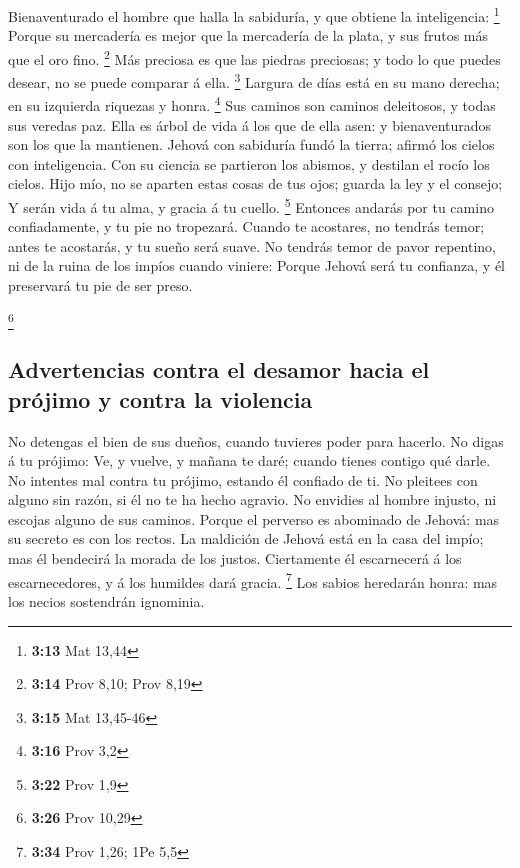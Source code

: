  Bienaventurado el hombre que halla la sabiduría, y que
obtiene la inteligencia: \footnote{\textbf{3:13} Mat 13,44}
 Porque su mercadería es mejor que la mercadería de la
plata, y sus frutos más que el oro fino. \footnote{\textbf{3:14} Prov
  8,10; Prov 8,19}  Más preciosa es que las piedras
preciosas; y todo lo que puedes desear, no se puede comparar á ella.
\footnote{\textbf{3:15} Mat 13,45-46}  Largura de días
está en su mano derecha; en su izquierda riquezas y honra. \footnote{\textbf{3:16}
  Prov 3,2}  Sus caminos son caminos deleitosos, y todas
sus veredas paz.  Ella es árbol de vida á los que de ella
asen: y bienaventurados son los que la mantienen.  Jehová
con sabiduría fundó la tierra; afirmó los cielos con inteligencia.
 Con su ciencia se partieron los abismos, y destilan el
rocío los cielos.  Hijo mío, no se aparten estas cosas de
tus ojos; guarda la ley y el consejo;  Y serán vida á tu
alma, y gracia á tu cuello. \footnote{\textbf{3:22} Prov 1,9}
 Entonces andarás por tu camino confiadamente, y tu pie
no tropezará.  Cuando te acostares, no tendrás temor;
antes te acostarás, y tu sueño será suave.  No tendrás
temor de pavor repentino, ni de la ruina de los impíos cuando viniere:
 Porque Jehová será tu confianza, y él preservará tu pie
de ser preso.

\footnote{\textbf{3:26} Prov 10,29}

\hypertarget{advertencias-contra-el-desamor-hacia-el-pruxf3jimo-y-contra-la-violencia}{%
\subsection{Advertencias contra el desamor hacia el prójimo y contra la
violencia}\label{advertencias-contra-el-desamor-hacia-el-pruxf3jimo-y-contra-la-violencia}}

 No detengas el bien de sus dueños, cuando tuvieres poder
para hacerlo.  No digas á tu prójimo: Ve, y vuelve, y
mañana te daré; cuando tienes contigo qué darle.  No
intentes mal contra tu prójimo, estando él confiado de ti.
 No pleitees con alguno sin razón, si él no te ha hecho
agravio.  No envidies al hombre injusto, ni escojas
alguno de sus caminos.  Porque el perverso es abominado
de Jehová: mas su secreto es con los rectos.  La
maldición de Jehová está en la casa del impío; mas él bendecirá la
morada de los justos.  Ciertamente él escarnecerá á los
escarnecedores, y á los humildes dará gracia. \footnote{\textbf{3:34}
  Prov 1,26; 1Pe 5,5}  Los sabios heredarán honra: mas
los necios sostendrán ignominia.

